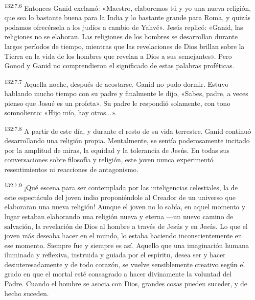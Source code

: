 \par
\textsuperscript{132:7.6} Entonces Ganid exclamó: «Maestro, elaboremos tú y yo una nueva religión, que sea lo bastante buena para la India y lo bastante grande para Roma, y quizás podamos ofrecérsela a los judíos a cambio de Yahvé». Jesús replicó: «Ganid, las religiones no se elaboran. Las religiones de los hombres se desarrollan durante largos períodos de tiempo, mientras que las revelaciones de Dios brillan sobre la Tierra en la vida de los hombres que revelan a Dios a sus semejantes». Pero Gonod y Ganid no comprendieron el significado de estas palabras proféticas.

\par
\textsuperscript{132:7.7} Aquella noche, después de acostarse, Ganid no pudo dormir. Estuvo hablando mucho tiempo con su padre y finalmente le dijo, «Sabes, padre, a veces pienso que Josué es un profeta». Su padre le respondió solamente, con tono somnoliento: «Hijo mío, hay otros...».

\par
\textsuperscript{132:7.8} A partir de este día, y durante el resto de su vida terrestre, Ganid continuó desarrollando una religión propia. Mentalmente, se sentía poderosamente incitado por la amplitud de miras, la equidad y la tolerancia de Jesús. En todas sus conversaciones sobre filosofía y religión, este joven nunca experimentó resentimientos ni reacciones de antagonismo.

\par
\textsuperscript{132:7.9} ¡Qué escena para ser contemplada por las inteligencias celestiales, la de este espectáculo del joven indio proponiéndole al Creador de un universo que elaboraran una nueva religión! Aunque el joven no lo sabía, en aquel momento y lugar estaban elaborando una religión nueva y eterna ---un nuevo camino de salvación, la revelación de Dios al hombre a través de Jesús y en Jesús. Lo que el joven más deseaba hacer en el mundo, lo estaba haciendo inconscientemente en ese momento. Siempre fue y siempre es así. Aquello que una imaginación humana iluminada y reflexiva, instruida y guiada por el espíritu, desea ser y hacer desinteresadamente y de todo corazón, se vuelve sensiblemente creativo según el grado en que el mortal esté consagrado a hacer divinamente la voluntad del Padre. Cuando el hombre se asocia con Dios, grandes cosas pueden suceder, y de hecho suceden.